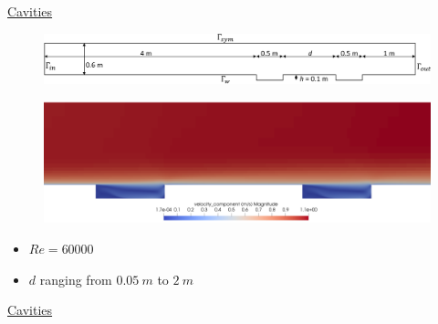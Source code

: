 \documentclass{beamer}
\begin{document}
\begin{frame}[label=cavities]{\hyperlink{cavitiesSupp}{Cavities}}
\begin{figure}
	\centering
	\includegraphics[width=\textwidth]{cavities_domain.pdf}
\end{figure}
\begin{figure}
	\centering
	\includegraphics[width=\textwidth, trim={0 0 0 6cm}, 
	clip]{cavities_dist1_vel.png}
\end{figure}
\begin{itemize}
	\item $Re = 60000$
	\item $d$ ranging from $\SI{0.05}{m}$ to $\SI{2}{m}$
\end{itemize}
\end{frame}
\begin{frame}{\hyperlink{cavitiesSupp}{Cavities}}
\begin{figure}
	\centering
	\subfloat[\scriptsize $u$ profile at $y=h$, 
	$d=1$]{\hspace{-0.5cm}}
\end{figure}
\end{frame}
\end{document}

